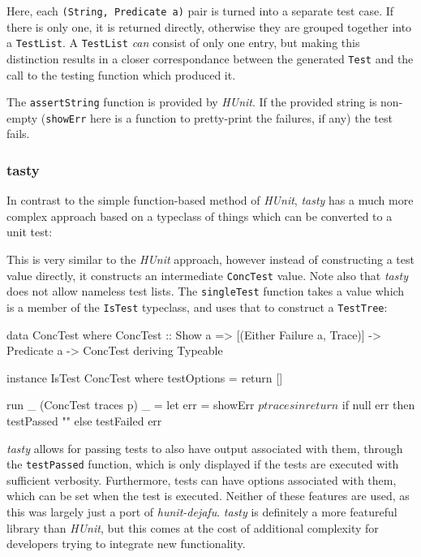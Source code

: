 Here, each \verb|(String, Predicate a)| pair is turned into a separate
test case. If there is only one, it is returned directly, otherwise
they are grouped together into a \verb|TestList|. A \verb|TestList|
\emph{can} consist of only one entry, but making this distinction
results in a closer correspondance between the generated \verb|Test|
and the call to the testing function which produced it.

The \verb|assertString| function is provided by \emph{HUnit}. If the
provided string is non-empty (\verb|showErr| here is a function to
pretty-print the failures, if any) the test fails.

\subsubsection{tasty}
\label{sec:practice-integration-tasty}

In contrast to the simple function-based method of \emph{HUnit},
\emph{tasty} has a much more complex approach based on a typeclass of
things which can be converted to a unit test:


This is very similar to the \emph{HUnit} approach, however instead of
constructing a test value directly, it constructs an intermediate
\verb|ConcTest| value. Note also that \emph{tasty} does not allow
nameless test lists. The \verb|singleTest| function takes a value
which is a member of the \verb|IsTest| typeclass, and uses that to
construct a \verb|TestTree|:

\begin{haskellcode}
data ConcTest where
  ConcTest :: Show a => [(Either Failure a, Trace)] -> Predicate a -> ConcTest
  deriving Typeable

instance IsTest ConcTest where
  testOptions = return []

  run _ (ConcTest traces p) _ =
    let err = showErr $ p traces
     in return $ if null err then testPassed "" else testFailed err
\end{haskellcode}

\emph{tasty} allows for passing tests to also have output associated
with them, through the \verb|testPassed| function, which is only
displayed if the tests are executed with sufficient
verbosity. Furthermore, tests can have options associated with them,
which can be set when the test is executed. Neither of these features
are used, as this was largely just a port of
\emph{hunit-dejafu}. \emph{tasty} is definitely a more featureful
library than \emph{HUnit}, but this comes at the cost of additional
complexity for developers trying to integrate new functionality.
